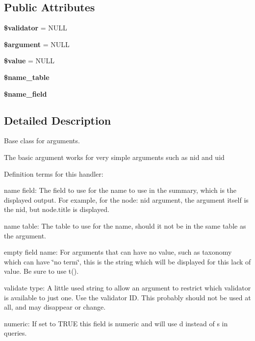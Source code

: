 \subsection*{Public Attributes}
\begin{DoxyCompactItemize}
\item 
\hypertarget{classviews__handler__argument_ab0bada5acdd0a44af3302b49017512f0}{
{\bfseries \$validator} = NULL}
\label{classviews__handler__argument_ab0bada5acdd0a44af3302b49017512f0}

\item 
\hypertarget{classviews__handler__argument_ae9aef57889eb9a24094a91223ad3be58}{
{\bfseries \$argument} = NULL}
\label{classviews__handler__argument_ae9aef57889eb9a24094a91223ad3be58}

\item 
\hypertarget{classviews__handler__argument_a9c83cc62d65bec7a97fab08bb4955ca0}{
{\bfseries \$value} = NULL}
\label{classviews__handler__argument_a9c83cc62d65bec7a97fab08bb4955ca0}

\item 
\hypertarget{classviews__handler__argument_a00295b455c88bd230def9209a5f344be}{
{\bfseries \$name\_\-table}}
\label{classviews__handler__argument_a00295b455c88bd230def9209a5f344be}

\item 
\hypertarget{classviews__handler__argument_a9acd19b59a96f8ad33f3643782c8a084}{
{\bfseries \$name\_\-field}}
\label{classviews__handler__argument_a9acd19b59a96f8ad33f3643782c8a084}

\end{DoxyCompactItemize}


\subsection{Detailed Description}
Base class for arguments.

The basic argument works for very simple arguments such as nid and uid

Definition terms for this handler:
\begin{DoxyItemize}
\item name field: The field to use for the name to use in the summary, which is the displayed output. For example, for the node: nid argument, the argument itself is the nid, but node.title is displayed.
\item name table: The table to use for the name, should it not be in the same table as the argument.
\item empty field name: For arguments that can have no value, such as taxonomy which can have \char`\"{}no term\char`\"{}, this is the string which will be displayed for this lack of value. Be sure to use t().
\item validate type: A little used string to allow an argument to restrict which validator is available to just one. Use the validator ID. This probably should not be used at all, and may disappear or change.
\item numeric: If set to TRUE this field is numeric and will use d instead of s in queries. 
\end{DoxyItemize}

